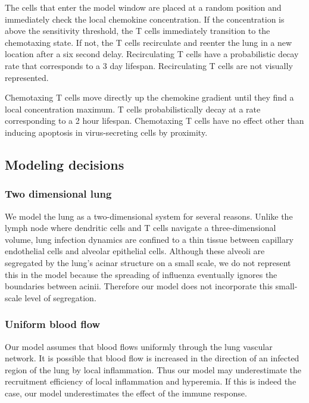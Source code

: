 \documentclass[preprint,10pt,authoryear]{article}
\begin{document}
The cells that enter the model window are placed at a random position and immediately check the local chemokine concentration.  If the concentration is above the sensitivity threshold, the T cells immediately transition to the chemotaxing state.  If not, the T cells recirculate and reenter the lung in a new location after a six second delay.  Recirculating T cells have a probabilistic decay rate that corresponds to a 3 day lifespan.  Recirculating T cells are not visually represented.  

Chemotaxing T cells move directly up the chemokine gradient until they find a local concentration maximum.  T cells probabilistically decay at a rate corresponding to a 2 hour lifespan.  Chemotaxing T cells have no effect other than inducing apoptosis in virus-secreting cells by proximity.


\subsection{Modeling decisions}

\subsubsection{Two dimensional lung}

We model the lung as a two-dimensional system for several reasons.  Unlike the lymph node where dendritic cells and T cells navigate a three-dimensional volume, lung infection dynamics are confined to a thin tissue between capillary endothelial cells and alveolar epithelial cells.  Although these alveoli are segregated by the lung's acinar structure on a small scale, we do not represent this in the model because the spreading of influenza eventually ignores the boundaries between acinii.  Therefore our model does not incorporate this small-scale level of segregation. 

\subsubsection{Uniform blood flow}

Our model assumes that blood flows uniformly through the lung vascular network.  It is possible that blood flow is increased in the direction of an infected region of the lung by local inflammation.  Thus our model may underestimate the recruitment efficiency of local inflammation and hyperemia.  If this is indeed the case, our model underestimates the effect of the immune response.
\end{document}
